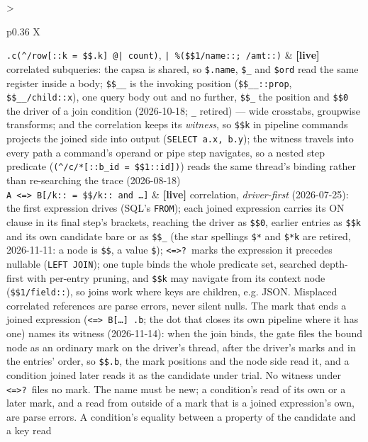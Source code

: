 \documentclass{report}
\newcommand{\live}{\textbf{\textcolor{blue!60!black}{[live]}}\xspace}
\begin{document}
\begin{xltabular}{\textwidth}{>{\raggedright\arraybackslash}p{0.36\textwidth} X}
\texttt{.c(\^{}/row[::k = \$\$.k] @| count)},
\texttt{| \%(\$\$1/name::; /amt::)}
  & \live correlated subqueries: the capsa is shared, so
    \texttt{\$.name}, \texttt{\$\_} and \texttt{\$ord} read the same
    register inside a body; \texttt{\$\$\_\_} is the invoking
    position (\texttt{\$\$\_\_::prop}, \texttt{\$\$\_\_/child::x}),
    one query body out and no further, \texttt{\$\$\_} the position
    and \texttt{\$\$0} the driver of a join condition (2026-10-18;
    \texttt{\_} retired)
    — wide crosstabs, groupwise transforms; and the correlation
    keeps its \emph{witness}, so \texttt{\$\$k} in pipeline commands
    projects the joined side into output (\texttt{SELECT a.x, b.y});
    the witness travels into every path a command's operand or pipe
    step navigates, so a nested step predicate
    (\texttt{(\^{}/c/*[::b\_id = \$\$1::id])}) reads the same
    thread's binding rather than re-searching the trace
    (2026-08-18) \\
\texttt{A <=> B[/k:: = \$\$/k:: and …]}
  & \live correlation, \emph{driver-first} (2026-07-25): the first
    expression drives (SQL's \texttt{FROM}); each joined
    expression carries its ON clause in its final step's brackets,
    reaching the driver as \texttt{\$\$0}, earlier entries as
    \texttt{\$\$k} and its own candidate bare or as
    \texttt{\$\$\_} (the star spellings \texttt{\$*} and
    \texttt{\$*k} are retired, 2026-11-11: a node is
    \texttt{\$\$}, a value \texttt{\$}); \texttt{<=>?}\ marks
    the expression it precedes
    nullable (\texttt{LEFT JOIN}); one tuple binds the whole
    predicate set, searched depth-first with per-entry pruning,
    and \texttt{\$\$k} may navigate from its context node
    (\texttt{\$\$1/field::}), so joins work where keys are
    children, e.g. JSON. Misplaced correlated references are
    parse errors, never silent nulls. The mark that ends a joined
    expression (\texttt{<=> B[…] .b}; the dot that closes its own
    pipeline where it has one) names its witness (2026-11-14): when
    the join binds, the gate files the bound node as an ordinary
    mark on the driver's thread, after the driver's marks and in
    the entries' order, so \texttt{\$\$.b}, the mark positions and
    the node side read it, and a condition joined later reads it as
    the candidate under trial. No witness under \texttt{<=>?}\
    files no mark. The name must be new; a condition's read of its
    own or a later mark, and a read from outside of a mark that is
    a joined expression's own, are parse errors. A condition's
    equality between a property of the candidate and a key read

\end{xltabular}
\end{document}
